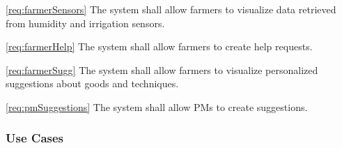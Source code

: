\documentclass[10pt]{article}
\begin{document}
\begin{description}
\begin{description}
            \item \ref{req:farmerSensors} The system shall allow farmers to visualize data retrieved from humidity and irrigation sensors.
            \item \ref{req:farmerHelp} The system shall allow farmers to create help requests.     
            \item \ref{req:farmerSugg} The system shall allow farmers to visualize personalized suggestions about goods and techniques.
            \item \ref{req:pmSuggestions} The system shall allow PMs to create suggestions.
        \end{description}
\end{description}
\newpage
\subsubsection{Use Cases}
\end{document}
